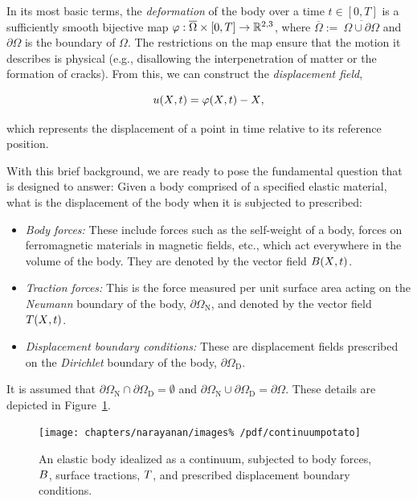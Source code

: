 In its most basic terms, the {\em deformation} of the body over a time
$t \in [0, T]$ is a sufficiently smooth bijective map $\mbox{$\varphi$}:
\overline{\Omega} \times [0,T] \rightarrow \mathbb{R}^{2, 3}$, where
$\overline{\Omega} :=\ \overline{\Omega\cup\partial\Omega}$ and
$\partial\Omega$ is the boundary of $\Omega$. The restrictions on the
map ensure that the motion it describes is physical (e.g., disallowing
the interpenetration of matter or the formation of cracks). From this,
we can construct the {\em displacement field},

\begin{equation}
  \mbox{$ u$}(\mbox{$ X$}, t) = \mbox{$\varphi$}(\mbox{$ X$}, t) - \mbox{$ X$},
\end{equation}

\noindent which represents the displacement of a point in time
relative to its reference position.

With this brief background, we are ready to pose the fundamental
question that \twist{} is designed to answer: Given a body comprised
of a specified elastic material, what is the displacement of the body
when it is subjected to prescribed:

\begin{itemize}
\item {\em Body forces:} These include forces such as the self-weight
  of a body, forces on ferromagnetic materials in magnetic fields,
  etc., which act everywhere in the volume of the body. They are
  denoted by the vector field $\mbox{$ B$}(\mbox{$ X$}, t)$.
\item {\em Traction forces:} This is the force measured per unit
  surface area acting on the {\em Neumann} boundary of the body,
  $\partial\Omega_{\mathrm{N}}$, and denoted by the vector field
  $\mbox{$ T$}(\mbox{$ X$}, t)$.
\item {\em Displacement boundary conditions:} These are displacement
  fields prescribed on the {\em Dirichlet} boundary of the body,
  $\partial\Omega_{\mathrm{D}}$.
\end{itemize}

\noindent It is assumed that $\partial\Omega_{\mathrm{N}}
\cap \partial\Omega_{\mathrm{D}} = \emptyset$ and
$\partial\Omega_{\mathrm{N}} \cup \partial\Omega_{\mathrm{D}}
= \partial\Omega$. These details are depicted in
Figure~\ref{fig:narayanan:continuumpotato}.

\begin{figure}[ht]
  \begin{center}
    \texttt{[image: chapters/narayanan/images\%
      /pdf/continuumpotato]}
    \label{fig:narayanan:continuumpotato}
  \end{center}
  \caption{An elastic body idealized as a continuum, subjected to body
    forces, $\mbox{$ B$}$, surface tractions, $\mbox{$ T$}$, and prescribed
    displacement boundary conditions.}
\end{figure}

